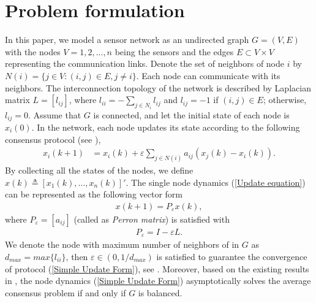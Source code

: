 \documentclass[10pt,journal,compsoc]{IEEEtran}
\begin{document}
\section{Problem formulation}\label{Problem formulation}
In this paper, we model a sensor network as an undirected graph $G =(V,E)$ with the nodes $V = {1,2,...,n}$ being the sensors and the edges $E\subset V \times V$ representing the communication links. Denote the set of neighbors of node $i$ by $N(i)=\{j\in V:(i, j)\in E, j\neq i\}$. Each node can communicate with its neighbors. The interconnection topology of the network is described by Laplacian matrix $L=[l_{ij}]$, where $l_{ii}=-\sum_{j \in N_i}l_{ij}$ and $l_{ij}=-1$ if $(i, j) \in E$; otherwise, $l_{ij}=0$. Assume that $G$ is connected, and let the initial state of each node is $x_{i}(0)$. In the network, each node updates its state according to the following consensus protocol (see \cite{Olfatisaber2004Consensus}),
\begin{equation} \label{Update equation}
\begin{split}
x_{i}(k+1)&=x_{i}(k)+\varepsilon\underset{j\in N(i)}{\sum}a_{ij}(x_{j}(k)-x_{i}(k)).
\end{split}
\end{equation}
By collecting all the states of the nodes, we define $x(k) \triangleq [x_1(k),\ldots,x_n(k)]'$. The single node dynamics (\ref{Update equation}) can be represented as the following vector form
\begin{equation} \label{Simple Update Form}
\begin{split}
x(k+1)=P_{\varepsilon}x(k),
\end{split}
\end{equation}
where $P_{\varepsilon}=[a_{ij}]$ (called as \textit{Perron matrix}) is satisfied with
 \begin{equation} \label{Calculate P}
\begin{split}
P_{\varepsilon}=I-\varepsilon L.
\end{split}
\end{equation}
We denote the node with maximum number of neighbors of in $G$ as $d_{max}=max\{l_{ii}\}$, then $\varepsilon \in (0, 1/d_{max})$ is satisfied to guarantee the convergence of protocol (\ref{Simple Update Form}), see \cite{Olfatisaber2004Consensus}. Moreover, based on the existing results in \cite{Olfatisaber2004Consensus}, the node dynamics (\ref{Simple Update Form}) asymptotically solves the average consensus problem if and only if $G$ is balanced.
\end{document}
